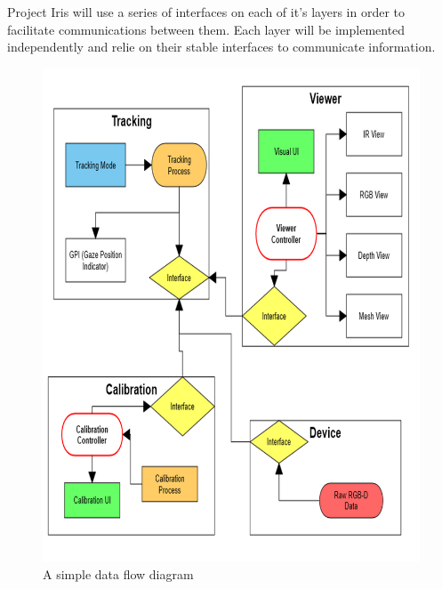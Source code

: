 Project Iris will use a series of interfaces on each of it's layers in order to facilitate communications between them. Each layer will be implemented independently and relie on their stable interfaces to communicate information.

\begin{figure}[h!]
	\centering
 	\includegraphics[width=\textwidth]{images/system-architecture}
 \caption{A simple data flow diagram}
\end{figure}
